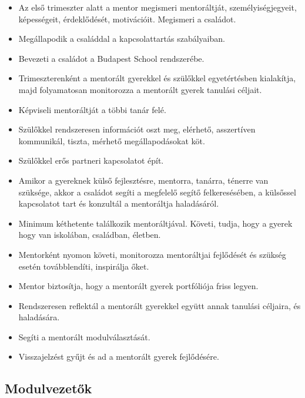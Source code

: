 \begin{itemize}
  \item
        Az első trimeszter alatt a mentor megismeri mentoráltját,
        személyiségjegyeit, képességeit, érdeklődését, motivációit. Megismeri
        a családot.
  \item
        Megállapodik a családdal a kapcsolattartás szabályaiban.
  \item
        Bevezeti a családot a Budapest School rendszerébe.
  \item
        Trimeszterenként a mentorált gyerekkel és szülőkkel egyetértésben
        kialakítja, majd folyamatosan monitorozza a mentorált gyerek tanulási céljait.
  \item
        Képviseli mentoráltját a többi tanár felé.
  \item
        Szülőkkel rendszeresen információt oszt meg, elérhető, asszertíven
        kommunikál, tiszta, mérhető megállapodásokat köt.
  \item
        Szülőkkel erős partneri kapcsolatot épít.
  \item
        Amikor a gyereknek külső fejlesztésre, mentorra, tanárra, ténerre van szüksége, akkor a családot
        segíti a megfelelő segítő felkeresésében, a külsőssel
        kapcsolatot tart és konzultál a mentoráltja haladásáról.
  \item
        Minimum kéthetente találkozik mentoráltjával. Követi, tudja, hogy a
        gyerek hogy van iskolában, családban, életben.
  \item
        Mentorként nyomon követi, monitorozza mentoráltjai fejlődését és
        szükség esetén továbblendíti, inspirálja őket.
  \item
        Mentor biztosítja, hogy a mentorált gyerek portfóliója friss legyen.
  \item
        Rendszeresen reflektál a mentorált gyerekkel együtt annak tanulási
        céljaira, és haladására.
  \item
        Segíti a mentorált modulválasztását.
  \item
        Visszajelzést gyűjt és ad a mentorált gyerek fejlődésére.
\end{itemize}

\subsection{Modulvezetők}\label{modulvezetux151k}

